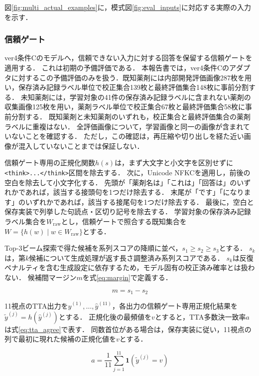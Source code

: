 \documentclass[uplatex,dvipdfmx]{jsarticle}
\begin{document}
図\ref{fig:multi_actual_examples}に，模式図\ref{fig:eval_inputs}に対応する実際の入力を示す．

\subsubsection{信頼ゲート}

ver4条件Cのモデルへ，信頼できない入力に対する回答を保留する信頼ゲートを適用する．
これは初期の予備評価である．
本報告書では，ver4条件Cのアダプタに対するこの予備評価のみを扱う．既知薬剤には内部開発評価画像287枚を用い，保存済み記録ラベル単位で校正集合139枚と最終評価集合148枚に事前分割する．
未知薬剤には，学習対象の41件の保存済み記録ラベルに含まれない薬剤の収集画像125枚を用い，薬剤ラベル単位で校正集合67枚と最終評価集合58枚に事前分割する．
既知薬剤と未知薬剤のいずれも，校正集合と最終評価集合の薬剤ラベルに重複はない．
全評価画像について，学習画像と同一の画像が含まれていないことを確認する．
ただし，この確認は，再圧縮や切り出しを経た近い画像が混入していないことまでは保証しない．

信頼ゲート専用の正規化関数$h(s)$は，まず大文字と小文字を区別せずに\texttt{<think>...</think>}区間を除去する．
次に，Unicode NFKCを適用し，前後の空白を除去して小文字化する．
先頭が「薬剤名は」「これは」「回答は」のいずれかであれば，該当する接頭句を1つだけ除去する．
末尾が「です」「になります」のいずれかであれば，該当する接尾句を1つだけ除去する．
最後に，空白と保存実装で列挙した句読点・区切り記号を除去する．
学習対象の保存済み記録ラベル集合を$W_{\mathrm{raw}}$とし，信頼ゲートで照合する既知集合を$W=\{h(w)\mid w\in W_{\mathrm{raw}}\}$とする．

Top-3ビーム探索で得た候補を系列スコアの降順に並べ，$s_1 \geq s_2 \geq s_3$とする．
$s_k$は，第$k$候補について生成処理が返す長さ調整済み系列スコアである．
$s_k$は反復ペナルティを含む生成設定に依存するため，モデル固有の校正済み確率とは扱わない．
候補間マージン$m$を式\eqref{eq:margin}で定義する．

\begin{equation}
  m = s_1 - s_2
  \label{eq:margin}
\end{equation}

11視点のTTA出力を$\hat{y}^{(1)},\ldots,\hat{y}^{(11)}$，各出力の信頼ゲート専用正規化結果を$\tilde{y}^{(j)}=h(\hat{y}^{(j)})$とする．
正規化後の最頻値を$v$とすると，TTA多数決一致率$a$は式\eqref{eq:tta_agree}で表す．
同数首位がある場合は，保存実装に従い，11視点の列で最初に現れた候補の正規化値を$v$とする．

\begin{equation}
  a = \frac{1}{11}\sum_{j=1}^{11}\mathbf{1}\!\left(\tilde{y}^{(j)} = v\right)
  \label{eq:tta_agree}
\end{equation}
\end{document}
